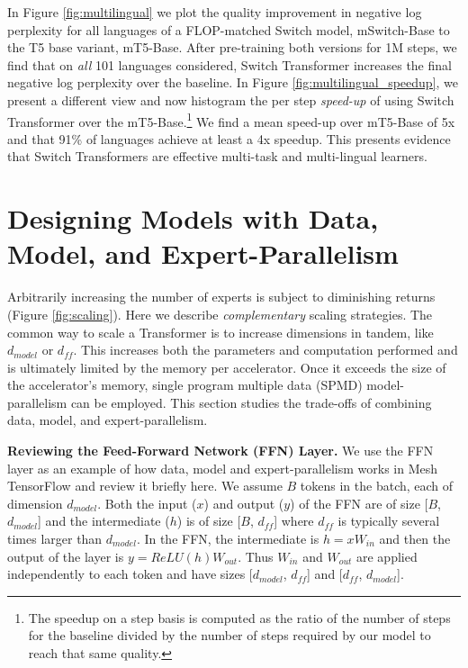 \documentclass[twoside,11pt]{article}
\begin{document}
In Figure \ref{fig:multilingual} we plot the quality improvement in negative log perplexity for all languages of a FLOP-matched Switch model, mSwitch-Base to the T5 base variant, mT5-Base.
After pre-training both versions for 1M steps, we find that on \emph{all} 101 languages considered, Switch Transformer increases the final negative log perplexity over the baseline.
In Figure \ref{fig:multilingual_speedup}, we present a different view and now histogram the per step \emph{speed-up} of using Switch Transformer over the mT5-Base.\footnote{The speedup on a step basis is computed as the ratio of the number of steps for the baseline divided by the number of steps required by our model to reach that same quality.}
We find a mean speed-up over mT5-Base of 5x and that 91\% of languages achieve at least a 4x speedup.
This presents evidence that Switch Transformers are effective multi-task and multi-lingual learners.

\section{Designing Models with Data, Model, and Expert-Parallelism}
Arbitrarily increasing the number of experts is subject to diminishing returns (Figure \ref{fig:scaling}).
Here we describe \emph{complementary} scaling strategies.
The common way to scale a Transformer is to increase dimensions in tandem, like $d_{model}$ or $d_{ff}$.
This increases both the parameters and computation performed and is ultimately limited by the memory per accelerator.
Once it exceeds the size of the accelerator's memory, single program multiple data (SPMD) model-parallelism can be employed.
This section studies the trade-offs of combining data, model, and expert-parallelism.

\textbf{Reviewing the Feed-Forward Network (FFN) Layer.} 
We use the FFN layer as an example of how data, model and expert-parallelism works in Mesh TensorFlow \citep{shazeer2018mesh} and review it briefly here.
We assume $B$ tokens in the batch, each of dimension $d_{model}$.
Both the input ($x$) and output ($y$) of the FFN are of size [$B$, $d_{model}$] and the intermediate ($h$) is of size [$B$, $d_{ff}$] where $d_{ff}$ is typically several times larger than $d_{model}$.
In the FFN, the intermediate is $h=x W_{in}$ and then the output of the layer is $y = ReLU(h) W_{out}$.
Thus $W_{in}$ and $W_{out}$ are applied independently to each token and have sizes [$d_{model}$, $d_{ff}$] and [$d_{ff}$, $d_{model}$].
\end{document}
